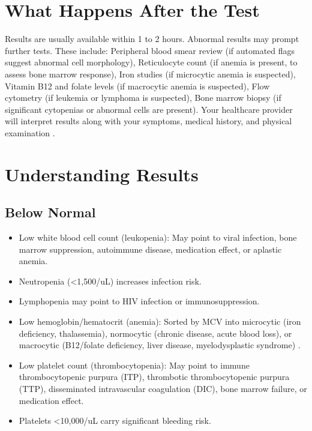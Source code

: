 \section*{What Happens After the Test}
Results are usually available within 1 to 2 hours. Abnormal results may prompt further tests. These include: Peripheral blood smear review (if automated flags suggest abnormal cell morphology), Reticulocyte count (if anemia is present, to assess bone marrow response), Iron studies (if microcytic anemia is suspected), Vitamin B12 and folate levels (if macrocytic anemia is suspected), Flow cytometry (if leukemia or lymphoma is suspected), Bone marrow biopsy (if significant cytopenias or abnormal cells are present). Your healthcare provider will interpret results along with your symptoms, medical history, and physical examination \cite{tierney2023current}.

\section*{Understanding Results}

\subsection*{Below Normal}
\begin{itemize}
  \item Low white blood cell count (leukopenia): May point to viral infection, bone marrow suppression, autoimmune disease, medication effect, or aplastic anemia.
  \item Neutropenia (<1,500/uL) increases infection risk.
  \item Lymphopenia may point to HIV infection or immunosuppression.
  \item Low hemoglobin/hematocrit (anemia): Sorted by MCV into microcytic (iron deficiency, thalassemia), normocytic (chronic disease, acute blood loss), or macrocytic (B12/folate deficiency, liver disease, myelodysplastic syndrome) \cite{fischbach2023manual}.
  \item Low platelet count (thrombocytopenia): May point to immune thrombocytopenic purpura (ITP), thrombotic thrombocytopenic purpura (TTP), disseminated intravascular coagulation (DIC), bone marrow failure, or medication effect.
  \item Platelets <10,000/uL carry significant bleeding risk.
\end{itemize}

